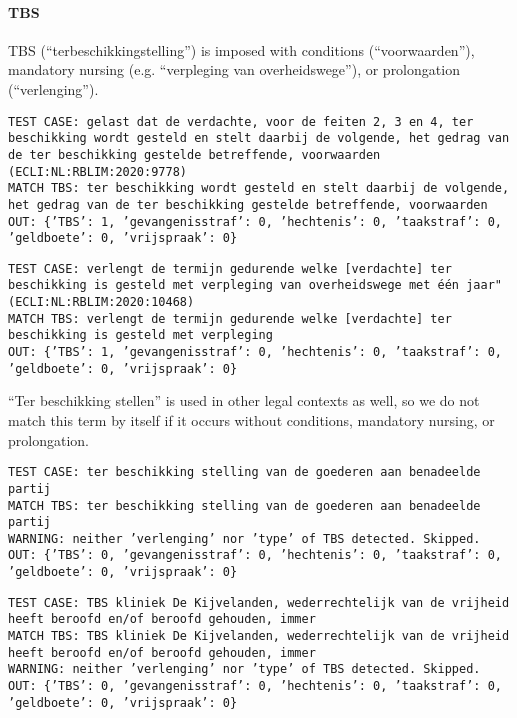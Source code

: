 \documentclass[a4paper]{article}
\begin{document}
\paragraph{TBS}

TBS (``terbeschikkingstelling'') is imposed with conditions (``voorwaarden''), mandatory nursing (e.g. ``verpleging van overheidswege''), or prolongation (``verlenging'').

\texttt{TEST CASE: %
gelast dat de verdachte, voor de feiten 2, 3 en 4, ter beschikking wordt gesteld en stelt daarbij de volgende, het gedrag van de ter beschikking gestelde betreffende, voorwaarden (ECLI:NL:RBLIM:2020:9778)\\
MATCH TBS: ter beschikking wordt gesteld en stelt daarbij de volgende, het gedrag van de ter beschikking gestelde betreffende, voorwaarden\\
OUT: \{'TBS': 1, 'gevangenisstraf': 0, 'hechtenis': 0, 'taakstraf': 0, 'geldboete': 0, 'vrijspraak': 0\}}

\texttt{TEST CASE: %
verlengt de termijn gedurende welke [verdachte] ter beschikking is gesteld met verpleging van overheidswege met één jaar" (ECLI:NL:RBLIM:2020:10468)\\
MATCH TBS: verlengt de termijn gedurende welke [verdachte] ter beschikking is gesteld met verpleging\\
OUT: \{'TBS': 1, 'gevangenisstraf': 0, 'hechtenis': 0, 'taakstraf': 0, 'geldboete': 0, 'vrijspraak': 0\}}

``Ter beschikking stellen'' is used in other legal contexts as well, so we do not match this term by itself if it occurs without conditions, mandatory nursing, or prolongation.

\texttt{TEST CASE: %
ter beschikking stelling van de goederen aan benadeelde partij\\
MATCH TBS: ter beschikking stelling van de goederen aan benadeelde partij\\
WARNING: neither 'verlenging' nor 'type' of TBS detected. Skipped.\\
OUT: \{'TBS': 0, 'gevangenisstraf': 0, 'hechtenis': 0, 'taakstraf': 0, 'geldboete': 0, 'vrijspraak': 0\}}

\texttt{TEST CASE: %
TBS kliniek De Kijvelanden, wederrechtelijk van de vrijheid heeft beroofd en/of beroofd gehouden, immer\\
MATCH TBS: TBS kliniek De Kijvelanden, wederrechtelijk van de vrijheid heeft beroofd en/of beroofd gehouden, immer\\
WARNING: neither 'verlenging' nor 'type' of TBS detected. Skipped.\\
OUT: \{'TBS': 0, 'gevangenisstraf': 0, 'hechtenis': 0, 'taakstraf': 0, 'geldboete': 0, 'vrijspraak': 0\}}
\end{document}
